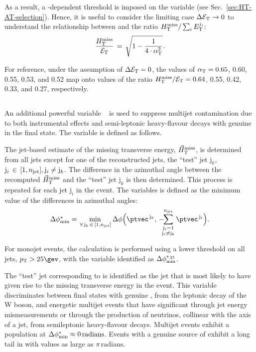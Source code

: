 As a result, a \scalht-dependent threshold is imposed on the \alphat
variable (see Sec.~\ref{sec:HT-AT-selection}). Hence, it is useful to
consider the limiting case $\Delta\mathcal{E}_\mathrm{T} \rightarrow 0$ to understand the
relationship between \alphat and the ratio $\mbox{$H_{\rm T}^{\rm miss}$}/\sum_{i}
E_\textrm{T}^{j_i}$:
\begin{equation}
  \label{eq:alphat3}
  \frac{\mbox{$H_{\rm T}^{\rm miss}$}}{\mathcal{E}_\mathrm{T}} \, = \, \sqrt{ 1 - \frac{1}{4 \cdot \alpha_{\text{T}}^2} }.
\end{equation}

For reference, under the assumption of $\Delta\mathcal{E}_\mathrm{T} = 0$, the values of
$\alpha_{\text{T}} = 0.65$, 0.60, 0.55, 0.53, and 0.52 map onto values of the
ratio $\mbox{$H_{\rm T}^{\rm miss}$}/\mathcal{E}_\mathrm{T} = 0.64$, 0.55, 0.42, 0.33, and 0.27, respectively.

\subsection{\texorpdfstring{\bdphi}{biased dPhi}}
\label{sec:bdphi-def}

An additional powerful variable \bdphi~\cite{Khachatryan:2011tk} is
used to suppress multijet contamination due to both instrumental
effects and semi-leptonic heavy-flavour decays with genuine \met in
the final state. The variable is defined as follows.

The jet-based estimate of the missing transverse energy, ${\mbox{$\vec{H}_{\rm T}^{\rm miss}$}}$,
is determined from all jets except for one of the reconstructed jets,
the ``test'' jet $\mathrm{j}_k$, \ie $\mathrm{j}_i \,\in\, [1,n_{\text{jet}}],
\mathrm{j}_i \ne \mathrm{j}_k$. The difference in the azimuthal angle
between the recomputed $\mbox{$\vec{H}_{\rm T}^{\rm miss}$}$ and the ``test'' jet $\mathrm{j}_k$
is then determined. This process is repeated for each jet
$\mathrm{j}_i$ in the event. The \bdphi variables is defined as the
minimum value of the differences in azimuthal angles:
\begin{equation}
  \bdphi = \min_{\,\forall\, \mathrm{j}_k\,\in\, [1,\njet]}
  \Delta\phi \Bigl( \ptvec^{\,\mathrm{j}_k}, \,
    -\hspace{-0.5em}\sum_{\substack{\mathrm{j}_i= 1 \\ \mathrm{j}_i \ne \mathrm{j}_k}}^{\njet}
    \ptvec^{\,\mathrm{j}_i} \Bigr).
  \label{eq:bdphi}
\end{equation}

For monojet events, the calculation is performed using a lower \Pt
threshold on all jets, $\Pt > 25\gev$, with the variable identified as
$\mbox{$\Delta\phi^{*_{\, 25}}_{\rm min}$}$.

The ``test'' jet corresponding to \bdphi is identified as the jet that
is most likely to have given rise to the missing transverse energy in
the event. This variable discriminates between final states with
genuine \ptvecmiss, \eg from the leptonic decay of the W boson, and
energetic multijet events that have significant \ptvecmiss through jet
energy mismeasurements or through the production of neutrinos,
collinear with the axis of a jet, from semileptonic heavy-flavour
decays. Multijet events exhibit a population at $\mbox{$\Delta\phi^{*}_{\rm min}$} \approx
0\,\mathrm{radians}$. Events with a genuine source of \ptvecmiss
exhibit a long tail in \bdphi with values as large as
$\pi\,\mathrm{radians}$.

